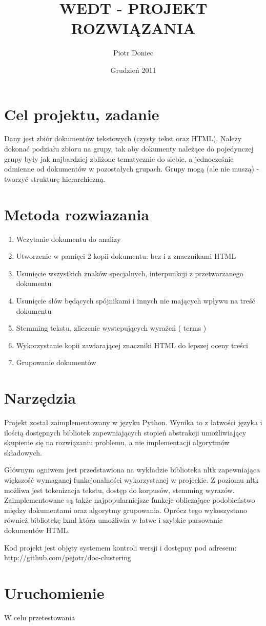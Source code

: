 \documentclass{article}
\begin{document}
\title{WEDT - PROJEKT ROZWIĄZANIA}
\author{Piotr Doniec}
\date {Grudzień 2011}
\maketitle

\section{Cel projektu, zadanie}
Dany jest zbiór dokumentów tekstowych (czysty tekst oraz HTML). Należy dokonać podziału zbioru na grupy, tak aby dokumenty należące do pojedynczej grupy były jak najbardziej zbliżone tematycznie do siebie, a jednocześnie odmienne od dokumentów w pozostałych grupach. Grupy mogą (ale nie muszą) - tworzyć strukturę hierarchiczną. 

\section{Metoda rozwiazania}
\begin{enumerate}
\item Wczytanie dokumentu do analizy
\item Utworzenie w pamięci 2 kopii dokumentu: bez i z znacznikami HTML
\item Usunięcie wszystkich znaków specjalnych, interpunkcji z przetwarzanego dokumentu
\item Usunięcie słów będących spójnikami i innych nie mających wpływu na treść dokumentu
\item Stemming tekstu, zliczenie wystepujących wyrażeń ( terms )
\item Wykorzystanie kopii zawiarającej znaczniki HTML do lepszej oceny treści
\item Grupowanie dokumentów
\end{enumerate}



\section{Narzędzia}
Projekt został zaimplementowany w języku Python. Wynika to z łatwości języka i ilością dostępnych bibliotek zapewniających stopień abstrakcji umożliwiający skupienie się na rozwiązaniu problemu, a nie implementacji algorytmów składowych.

Głównym ogniwem jest przedstawiona na wykładzie biblioteka nltk zapewniająca większość wymaganej funkcjonalności wykorzystanej w projeckie. Z poziomu nltk możliwa jest tokenizacja tekstu, dostęp do korpusów, stemming wyrazów. Zaimplementowane są także najpopularniejsze funkcje obliczające podobieństwo między dokumentami oraz algorytmy grupowania. Oprócz tego wykoszystano również bibliotekę lxml która umożliwia w łatwe i szybkie parsowanie dokumentów HTML.

Kod projekt jest objęty systemem kontroli wersji i dostępny pod adresem: http://github.com/pejotr/doc-clustering

\section{Uruchomienie}
W celu przetestowania 
\end{document}
